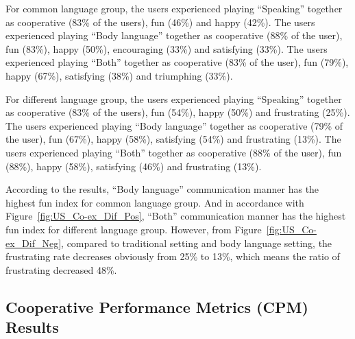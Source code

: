 For common language group, the users experienced playing ``Speaking'' together as cooperative (83\% of the users), fun (46\%) and happy (42\%). The users experienced playing ``Body language'' together as cooperative (88\% of the user), fun (83\%), happy (50\%), encouraging (33\%) and satisfying (33\%). The users experienced playing ``Both'' together as cooperative (83\% of the user), fun (79\%), happy (67\%), satisfying (38\%) and triumphing (33\%).

For different language group, the users experienced playing ``Speaking'' together as cooperative (83\% of the users), fun (54\%), happy (50\%) and frustrating (25\%). The users experienced playing ``Body language'' together as cooperative (79\% of the user), fun (67\%), happy (58\%), satisfying (54\%) and frustrating (13\%). The users experienced playing ``Both'' together as cooperative (88\% of the user), fun (88\%), happy (58\%), satisfying (46\%) and frustrating (13\%). 



According to the results, ``Body language'' communication manner has the highest fun index for common language group. And in accordance with Figure~\ref{fig:US_Co-ex_Dif_Pos}, ``Both'' communication manner has the highest fun index for different language group. However, from Figure~\ref{fig:US_Co-ex_Dif_Neg}, compared to traditional setting and body language setting, the frustrating rate decreases obviously from 25\% to 13\%, which means the ratio of frustrating decreased 48\%.


\subsection{Cooperative Performance Metrics (CPM) Results}

